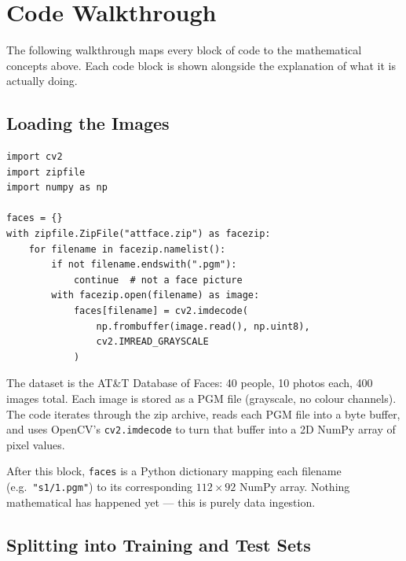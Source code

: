 \documentclass[12pt,a4paper]{article}
\begin{document}
\section{Code Walkthrough}

The following walkthrough maps every block of code to the mathematical
concepts above. Each code block is shown alongside the explanation of what
it is actually doing.

\subsection{Loading the Images}

\vspace{0.5em}
\begin{minipage}{\linewidth}
\begin{lstlisting}[caption={Reading face images from a zip archive}]
import cv2
import zipfile
import numpy as np

faces = {}
with zipfile.ZipFile("attface.zip") as facezip:
    for filename in facezip.namelist():
        if not filename.endswith(".pgm"):
            continue  # not a face picture
        with facezip.open(filename) as image:
            faces[filename] = cv2.imdecode(
                np.frombuffer(image.read(), np.uint8),
                cv2.IMREAD_GRAYSCALE
            )
\end{lstlisting}
\end{minipage}

The dataset is the AT\&T Database of Faces: 40 people, 10 photos each, 400
images total. Each image is stored as a PGM file (grayscale, no colour
channels). The code iterates through the zip archive, reads each PGM file
into a byte buffer, and uses OpenCV's \texttt{cv2.imdecode} to turn that
buffer into a 2D NumPy array of pixel values.

After this block, \texttt{faces} is a Python dictionary mapping each filename
(e.g.\ \texttt{"s1/1.pgm"}) to its corresponding $112 \times 92$ NumPy array.
Nothing mathematical has happened yet --- this is purely data ingestion.

\subsection{Splitting into Training and Test Sets}
\end{document}
